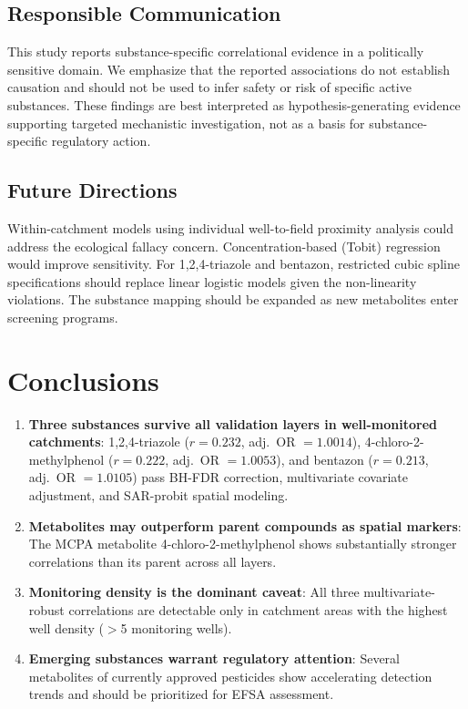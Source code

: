 \documentclass[12pt,a4paper]{article}
\begin{document}
\subsection{Responsible Communication}

This study reports substance-specific correlational evidence in a politically sensitive domain. We emphasize that the reported associations do not establish causation and should not be used to infer safety or risk of specific active substances. These findings are best interpreted as hypothesis-generating evidence supporting targeted mechanistic investigation, not as a basis for substance-specific regulatory action.

\subsection{Future Directions}

Within-catchment models using individual well-to-field proximity analysis could address the ecological fallacy concern. Concentration-based (Tobit) regression would improve sensitivity. For 1,2,4-triazole and bentazon, restricted cubic spline specifications should replace linear logistic models given the non-linearity violations. The substance mapping should be expanded as new metabolites enter screening programs.

\section{Conclusions}

\begin{enumerate}
\item \textbf{Three substances survive all validation layers in well-monitored catchments}: 1,2,4-triazole ($r = 0.232$, adj.\ OR $= 1.0014$), 4-chloro-2-methylphenol ($r = 0.222$, adj.\ OR $= 1.0053$), and bentazon ($r = 0.213$, adj.\ OR $= 1.0105$) pass BH-FDR correction, multivariate covariate adjustment, and SAR-probit spatial modeling.

\item \textbf{Metabolites may outperform parent compounds as spatial markers}: The MCPA metabolite 4-chloro-2-methylphenol shows substantially stronger correlations than its parent across all layers.

\item \textbf{Monitoring density is the dominant caveat}: All three multivariate-robust correlations are detectable only in catchment areas with the highest well density ($>$5 monitoring wells).

\item \textbf{Emerging substances warrant regulatory attention}: Several metabolites of currently approved pesticides show accelerating detection trends and should be prioritized for EFSA assessment.
\end{enumerate}
\end{document}
